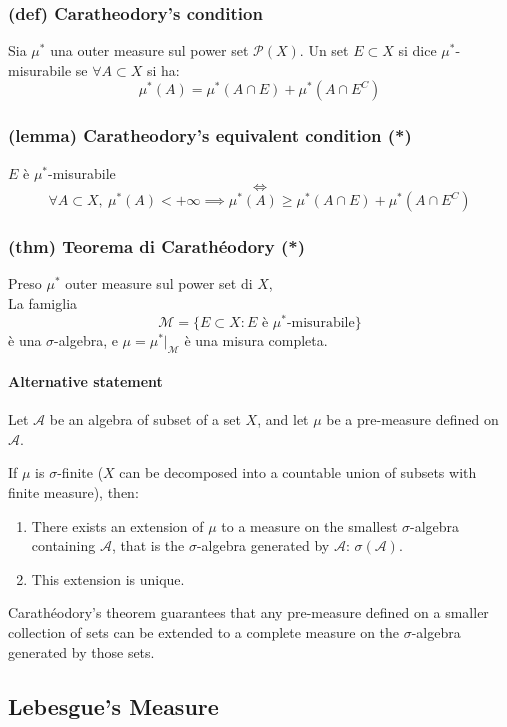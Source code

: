 \subsubsection{(def) Caratheodory's condition}
Sia $\mu^*$ una outer measure sul power set $\mathcal P(X)$.
Un set $E\subset X$ si dice $\mu^*$-misurabile se $\forall A\subset X$ si ha:
$$\mu^*(A)=\mu^*(A\cap E)+\mu^*(A\cap E^C)$$
\subsubsection{(lemma) Caratheodory's equivalent condition (*)}
$E$ è $\mu^*$-misurabile
$$\iff$$
$$\forall A \subset X,\ \mu^*(A)<+\infty \implies \mu^*(A)\ge \mu^*(A\cap E)+\mu^*(A\cap E^C)$$
\subsubsection{(thm) Teorema di Carathéodory (*)}
Preso $\mu^*$ outer measure sul power set di $X$,\\
La famiglia $$\mathcal M =\{E \subset X : E \text{ è } \mu^*\text{-misurabile}\}$$
è una $\sigma$-algebra, e $\mu=\mu^*\vert_{\mathcal M}$ è una misura completa.
\paragraph{Alternative statement}
Let $\mathcal A$ be an algebra of subset of a set $X$, and let $\mu$ be a pre-measure defined on $\mathcal A$.

If $\mu$ is $\sigma$-finite ($X$ can be decomposed into a countable union of subsets with finite measure), then:
\begin{enumerate}
    \item There exists an extension of $\mu$ to a measure on the smallest $\sigma$-algebra containing $\mathcal A$, that is the $\sigma$-algebra generated by $\mathcal A$: $\sigma(\mathcal A)$.
    \item This extension is unique.
\end{enumerate}
Carathéodory's theorem guarantees that any pre-measure defined on a smaller collection of sets can be extended to a complete measure on the $\sigma$-algebra generated by those sets.
\subsection{Lebesgue's Measure}
